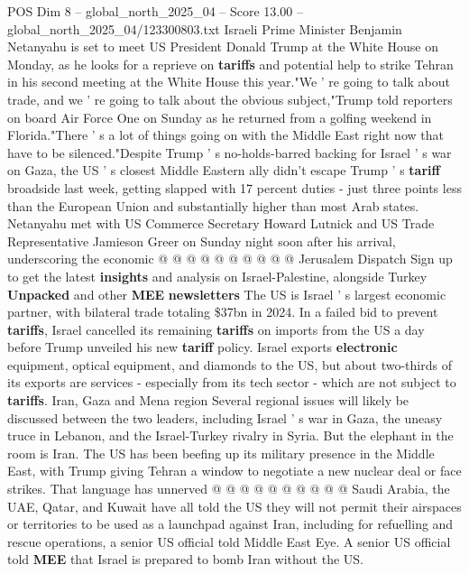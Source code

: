 \begin{textsample}{POS Dim 8 – global\_north\_2025\_04 – Score 13.00 – global\_north\_2025\_04/123300803.txt}  \label{ex:f8_pos_030}
Israeli Prime Minister Benjamin Netanyahu is set to meet US President Donald Trump at the White House on Monday, as he looks for a reprieve on \textbf{tariffs} and potential help to strike Tehran in his second meeting at the White House this year."We ' re going to talk about trade, and we ' re going to talk about the obvious subject,"Trump told reporters on board Air Force One on Sunday as he returned from a golfing weekend in Florida."There ' s a lot of things going on with the Middle East right now that have to be silenced."Despite Trump ' s no-holds-barred backing for Israel ' s war on Gaza, the US ' s closest Middle Eastern ally didn't escape Trump ' s \textbf{tariff} broadside last week, getting slapped with 17 percent duties - just three points less than the European Union and substantially higher than most Arab states.
Netanyahu met with US Commerce Secretary Howard Lutnick and US Trade Representative Jamieson Greer on Sunday night soon after his arrival, underscoring the economic @ @ @ @ @ @ @ @ @ @ Jerusalem Dispatch Sign up to get the latest \textbf{insights} and analysis on Israel-Palestine, alongside Turkey \textbf{Unpacked} and other \textbf{MEE} \textbf{newsletters} The US is Israel ' s largest economic partner, with bilateral trade totaling \$37bn in 2024.
In a failed bid to prevent \textbf{tariffs}, Israel cancelled its remaining \textbf{tariffs} on imports from the US a day before Trump unveiled his new \textbf{tariff} policy.
Israel exports \textbf{electronic} equipment, optical equipment, and diamonds to the US, but about two-thirds of its exports are services - especially from its tech sector - which are not subject to \textbf{tariffs}.
Iran, Gaza and Mena region Several regional issues will likely be discussed between the two leaders, including Israel ' s war in Gaza, the uneasy truce in Lebanon, and the Israel-Turkey rivalry in Syria.
But the elephant in the room is Iran.
The US has been beefing up its military presence in the Middle East, with Trump giving Tehran a window to negotiate a new nuclear deal or face strikes.
That language has unnerved @ @ @ @ @ @ @ @ @ @ Saudi Arabia, the UAE, Qatar, and Kuwait have all told the US they will not permit their airspaces or territories to be used as a launchpad against Iran, including for refuelling and rescue operations, a senior US official told Middle East Eye.
A senior US official told \textbf{MEE} that Israel is prepared to bomb Iran without the US.

\end{textsample}
